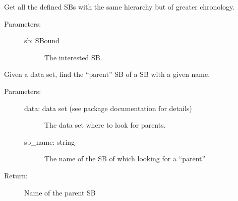 \documentclass[letterpaper,10pt,english]{sphinxmanual}
\begin{document}
\begin{fulllineitems}
\label{\detokenize{hiegeo:hiegeo.get_newer_sb_same_hie}}
Get all the defined SBs with the same hierarchy but
of greater chronology.
\begin{description}
\item[{Parameters:}] \leavevmode\begin{description}
\item[{sb: SBound}] \leavevmode
The interested SB.

\end{description}

\end{description}

\end{fulllineitems}


\begin{fulllineitems}
\label{\detokenize{hiegeo:hiegeo.get_parent_by_name}}
Given a data set, find the “parent” SB of a SB with a given name.
\begin{description}
\item[{Parameters:}] \leavevmode\begin{description}
\item[{data: data set (see package documentation for details)}] \leavevmode
The data set where to look for parents.

\item[{sb\_name: string}] \leavevmode
The name of the SB of which looking for a “parent”

\end{description}

\item[{Return:}] \leavevmode
Name of the parent SB

\end{description}

\end{fulllineitems}

\end{document}
